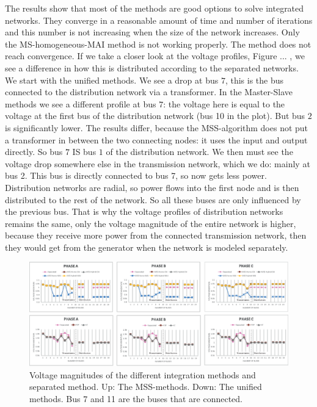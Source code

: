 \documentclass[10pt,journal]{article}
\begin{document}
The results show that most of the methods are good options to solve integrated networks. They converge in a reasonable amount of time and number of iterations and this number is not increasing when the size of the network increases. Only the MS-homogeneous-MAI method is not working properly. The method does not reach convergence. If we take a closer look at the voltage profiles, Figure ... , we see a difference in how this is distributed according to the separated networks. We start with the unified methods. We see a drop at bus $7$, this is the bus connected to the distribution network via a transformer. In the Master-Slave methods we see a different profile at bus $7$: the voltage here is equal to the voltage at the first bus of the distribution network (bus 10 in the plot). But bus $2$ is significantly lower. The results differ, because the MSS-algorithm does not put a transformer in between the two connecting nodes: it uses the input and output directly. So bus $7$ IS bus $1$ of the distribution network. We then must see the voltage drop somewhere else in the transmission network, which we do: mainly at bus 2. This bus is directly connected to bus 7, so now gets less power. \\
Distribution networks are radial, so power flows into the first node and is then distributed to the rest of the network. So all these buses are only influenced by the previous bus. That is why the voltage profiles of distribution networks remains the same, only the voltage magnitude of the entire network is higher, because they receive more power from the connected transmission network, then they would get from the generator when the network is modeled separately. 
\begin{figure}[h!]
    \centering
    \includegraphics[width=\textwidth]{Images/Enumathpaper.eps}
    \caption{Voltage magnitudes of the different integration methods and separated method. Up: The MSS-methods. Down: The unified methods. Bus 7 and 11 are the buses that are connected.}
    \label{fig:voltmag}
\end{figure}
\end{document}
